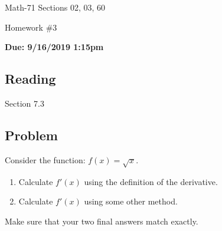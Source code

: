 \documentclass[letterpaper,12pt,fleqn]{article}
\begin{document}
\begin{center}
  \large
  Math-71 Sections 02, 03, 60

  \Large
  Homework \#3

  \large
  \textbf{Due: 9/16/2019 1:15pm}
\end{center}

\subsection*{Reading}

Section 7.3

\subsection*{Problem}

Consider the function: \(f(x)=\sqrt{x}\).
\begin{enumerate}
\item Calculate \(f'(x)\) using the definition of the derivative.
\item Calculate \(f'(x)\) using some other method.
\end{enumerate}
Make sure that your two final answers match exactly.
\end{document}
